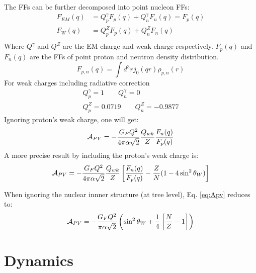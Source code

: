 The FFs can be further decomposed into point nucleon FFs:
\begin{equation}
    \begin{aligned}
	F_{EM}(q) &= Q^\gamma_p F_p(q) + Q^\gamma_n F_n(q)  = F_p(q)	\\
	F_{W}(q)  &= Q^Z_p F_p(q) + Q^Z_n F_n(q)  \\
    \end{aligned}
\end{equation}
Where $Q^\gamma$ and $Q^Z$ are the EM charge and weak charge respectively.
$F_p(q)$ and $F_n(q)$ are the FFs of point proton and neutron density distribution. 
\begin{equation}
    F_{p,n}(q) = \int d^3r j_0(qr) \rho_{p,n}(r)
\end{equation}
For weak charges including radiative correction
\begin{equation}
    \begin{gathered}
	Q^\gamma_p = 1  \qquad Q^\gamma_n = 0   \\
	Q^Z_p = 0.0719    \qquad Q^Z_n = -0.9877
    \end{gathered}
\end{equation}
Ignoring proton's weak charge, one will get:
\begin{equation}
    \mathcal{A}_{PV} = -\frac{G_FQ^2}{4\pi\alpha\sqrt{2}}\frac{Q_{wk}}{Z} \frac{F_n(q)}{F_p(q)} 
\end{equation}
A more precise result by including the proton's weak charge is:
\begin{equation}
    \mathcal{A}_{PV} = -\frac{G_FQ^2}{4\pi\alpha\sqrt{2}}\frac{Q_{wk}}{Z}\left[ \frac{F_n(q)}{F_p(q)} - \frac{Z}{N}(1-4\sin^2\theta_W) \right]
    \label{eq:Apv}
\end{equation}

When ignoring the nuclear innner structure (at tree level), Eq. \ref{eq:Apv} reduces to:
\begin{equation}
    \mathcal{A}_{PV} = -\frac{G_F Q^2}{\pi\alpha\sqrt{2}} \left(\sin^2\theta_W + \frac{1}{4}\left[ \frac{N}{Z} - 1 \right] \right)
\end{equation}

\section{Dynamics}
\begin{center}
\end{center}

